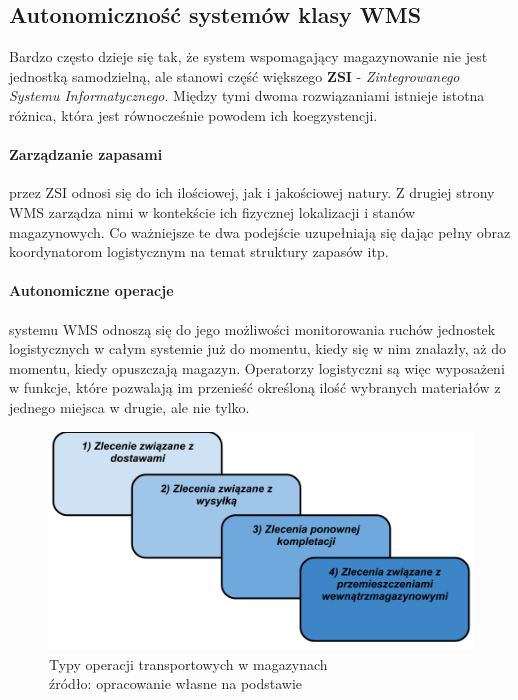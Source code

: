 	\subsection{Autonomiczność systemów klasy WMS}
		Bardzo często dzieje się tak, że system wspomagający magazynowanie nie jest jednostką samodzielną, ale 
		stanowi część większego \textbf{ZSI} - \textit{Zintegrowanego Systemu Informatycznego}. Między tymi
		dwoma rozwiązaniami istnieje istotna różnica, która jest równocześnie powodem ich koegzystencji.
			\paragraph{Zarządzanie zapasami} przez ZSI odnosi się do ich ilościowej, jak i jakościowej natury. Z
			drugiej strony WMS zarządza nimi w kontekście ich fizycznej lokalizacji i stanów magazynowych. Co
			ważniejsze te dwa podejście uzupełniają się dając pełny obraz koordynatorom logistycznym na temat
			struktury zapasów itp. 
			\paragraph{Autonomiczne operacje} systemu WMS odnoszą się do jego możliwości monitorowania ruchów
			jednostek logistycznych w całym systemie już do momentu, kiedy się w nim znalazły, aż do momentu,
			kiedy opuszczają magazyn. Operatorzy logistyczni są więc wypo\-sażeni w funkcje, które pozwalają
			im przenieść określoną ilość wybranych materiałów z jednego miejsca w drugie, ale nie tylko.
			\begin{figure}[H]
				\centering
				\includegraphics[width=\textwidth]{images/transport_ops}
				\caption[Operacja transportowe w magazynach]{
					Typy operacji transportowych w magazynach\\
					źródło: opracowanie własne na podstawie \cite{IDL}
				}
			\end{figure}
